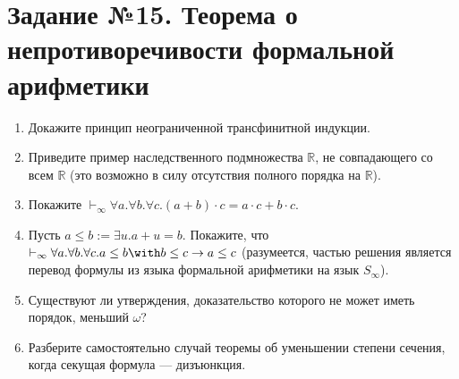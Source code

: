 \documentclass[10pt,a4paper,oneside]{article}
\begin{document}
\section*{Задание №15. Теорема о непротиворечивости формальной арифметики}
\begin{enumerate}
\item Докажите принцип неограниченной трансфинитной индукции.
\item Приведите пример наследственного подмножества $\mathbb{R}$, не совпадающего со всем $\mathbb{R}$ (это возможно в силу
отсутствия полного порядка на $\mathbb{R}$).
\item Покажите $\vdash_\infty\forall a.\forall b.\forall c.(a + b)\cdot c = a \cdot c + b \cdot c$.
\item Пусть $a \le b := \exists u.a + u = b$. Покажите, что $\vdash_\infty \forall a.\forall b.\forall c.a\le b \with b \le c \rightarrow a \le c$
(разумеется, частью решения является перевод формулы из языка формальной арифметики на язык $S_\infty$).
\item Существуют ли утверждения, доказательство которого не может иметь порядок, меньший $\omega$?
\item Разберите самостоятельно случай теоремы об уменьшении степени сечения, когда секущая формула --- дизъюнкция.
\end{enumerate}
\end{document}
